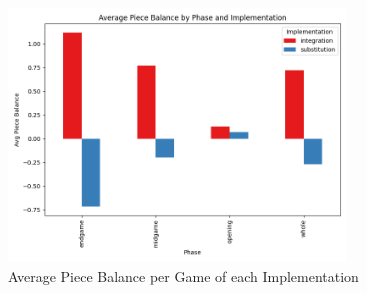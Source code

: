\begin{figure}[H]
    \centering
    \includegraphics[width=0.8\textwidth]{images/plots/implementation/Implementation_vs_avg_piece_balance_and_phase.png}
    \caption{Average Piece Balance per Game of each Implementation}
    \label{fig: implementation_vs_avg_piece_balance_and_phase }
\end{figure}





